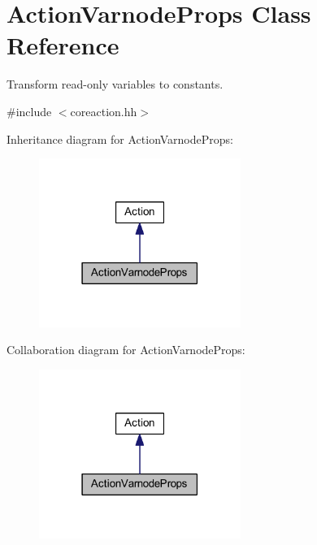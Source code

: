 \hypertarget{class_action_varnode_props}{}\section{Action\+Varnode\+Props Class Reference}
\label{class_action_varnode_props}


Transform read-\/only variables to constants.  




{\ttfamily \#include $<$coreaction.\+hh$>$}



Inheritance diagram for Action\+Varnode\+Props\+:
\nopagebreak
\begin{figure}[H]
\begin{center}
\leavevmode
\includegraphics[width=186pt]{class_action_varnode_props__inherit__graph}
\end{center}
\end{figure}


Collaboration diagram for Action\+Varnode\+Props\+:
\nopagebreak
\begin{figure}[H]
\begin{center}
\leavevmode
\includegraphics[width=186pt]{class_action_varnode_props__coll__graph}
\end{center}
\end{figure}
